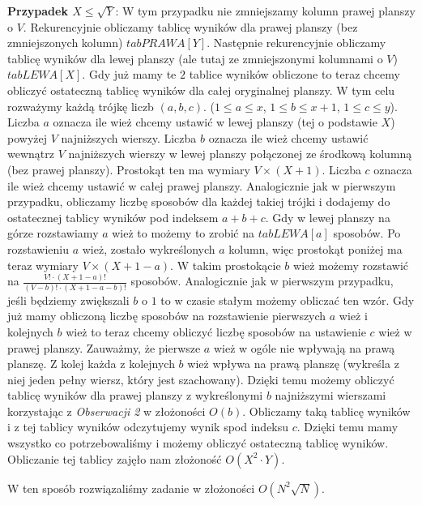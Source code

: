 \documentclass[opr,utf8]{sinol}
\newcounter{wn}
\begin{document}
\begin{tasktext}
\textbf{Przypadek $X \leq \sqrt{Y}$}: W tym przypadku nie zmniejszamy kolumn prawej planszy o $V$. Rekurencyjnie obliczamy tablicę wyników dla prawej planszy (bez zmniejszonych kolumn) $tabPRAWA[Y]$. Następnie rekurencyjnie obliczamy tablicę wyników dla lewej planszy (ale tutaj ze zmniejszonymi kolumnami o $V$) $tabLEWA[X]$. Gdy już mamy te $2$ tablice wyników obliczone to teraz chcemy obliczyć ostateczną tablicę wyników dla całej oryginalnej planszy. W tym celu rozważymy każdą trójkę liczb $(a, b, c)$. ($1 \leq a \leq x$, $1 \leq b \leq x+1$, $1 \leq c \leq y$). Liczba $a$ oznacza ile wież chcemy ustawić w lewej planszy (tej o podstawie $X$) powyżej $V$ najniższych wierszy. Liczba $b$ oznacza ile wież chcemy ustawić wewnątrz $V$ najniższych wierszy w lewej planszy połączonej ze środkową kolumną (bez prawej planszy). Prostokąt ten ma wymiary $V \times (X+1)$. Liczba $c$ oznacza ile wież chcemy ustawić w całej prawej planszy. Analogicznie jak w pierwszym przypadku, obliczamy liczbę sposobów dla każdej takiej trójki i dodajemy do ostatecznej tablicy wyników pod indeksem $a+b+c$. Gdy w lewej planszy na górze rozstawiamy $a$ wież to możemy to zrobić na $tabLEWA[a]$ sposobów. Po rozstawieniu $a$ wież, zostało wykreślonych $a$ kolumn, więc prostokąt poniżej ma teraz wymiary $V \times (X+1-a)$. W takim prostokącie $b$ wież możemy rozstawić na $\frac{V! \cdot (X+1-a)!}{(V-b)! \cdot (X+1-a-b)!}$ sposobów. Analogicznie jak w pierwszym przypadku, jeśli będziemy zwiększali $b$ o $1$ to w czasie stałym możemy obliczać ten wzór. Gdy już mamy obliczoną liczbę sposobów na rozstawienie pierwszych $a$ wież i kolejnych $b$ wież to teraz chcemy obliczyć liczbę sposobów na ustawienie $c$ wież w prawej planszy. Zauważmy, że pierwsze $a$ wież w ogóle nie wpływają na prawą planszę. Z kolej każda z kolejnych $b$ wież wpływa na prawą planszę (wykreśla z niej jeden pełny wiersz, który jest szachowany). Dzięki temu możemy obliczyć tablicę wyników dla prawej planszy z wykreślonymi $b$ najniższymi wierszami korzystając z \textit{Obserwacji 2} w złożoności $O(b)$. Obliczamy taką tablicę wyników i z tej tablicy wyników odczytujemy wynik spod indeksu $c$. Dzięki temu mamy wszystko co potrzebowaliśmy i możemy obliczyć ostateczną tablicę wyników. Obliczanie tej tablicy zajęło nam złożoność $O(X^2 \cdot Y)$.

W ten sposób rozwiązaliśmy zadanie w złożoności $O(N^2 \sqrt{N})$.

\end{tasktext}
\end{document}
